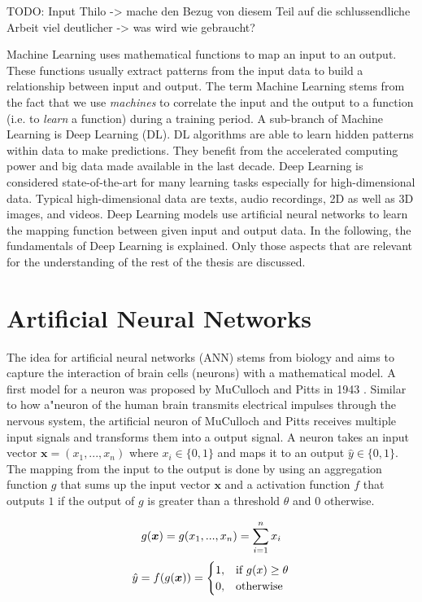 
TODO: Input Thilo -> mache den Bezug von diesem Teil auf die schlussendliche Arbeit viel deutlicher -> was wird wie gebraucht?

Machine Learning uses mathematical functions to map an input to an output.
These functions usually extract patterns from the input data to build a relationship between input and output.
The term Machine Learning stems from the fact that we use \emph{machines} to correlate the input and the output to a function (i.e. to \emph{learn} a function) during a training period.
A sub-branch of Machine Learning is Deep Learning (DL).
DL algorithms are able to learn hidden patterns within data to make predictions.
They benefit from the accelerated computing power and big data made available in the last decade.
Deep Learning is considered state-of-the-art for many learning tasks especially for high-dimensional data.
Typical high-dimensional data are texts, audio recordings, 2D as well as 3D images, and videos.
Deep Learning models use artificial neural networks to learn the mapping function between given input and output data.
In the following, the fundamentals of Deep Learning is explained.
Only those aspects that are relevant for the understanding of the rest of the thesis are discussed.

\section{Artificial Neural Networks}
The idea for artificial neural networks (ANN) stems from biology and aims to capture the interaction of brain cells (neurons) with a mathematical model.
A first model for a neuron was proposed by MuCulloch and Pitts in 1943 .
Similar to how a"neuron of the human brain transmits electrical impulses through the nervous system, the artificial neuron of MuCulloch and Pitts receives multiple input signals and transforms them into a output signal.
A neuron takes an input vector \(\boldsymbol{x} = (x_1, ..., x_n)\) where \(x_i \in \{0, 1\}\) and maps it to an output \(\hat{y} \in \{0, 1\}\).
The mapping from the input to the output is done by using an aggregation function \(g\) that sums up the input vector \(\boldsymbol{x}\) and a activation function \(f\) that outputs \(1\) if the output of \(g\) is greater than a threshold \(\theta\) and \(0\) otherwise.

\begin{equation}\eqlbl{McCulloch_Pitts_agg}
	g(\boldsymbol{x}) = g(x_1, ..., x_n) = \sum_{i=1}^{n}x_i\\
\end{equation}
\begin{equation}\eqlbl{McCulloch_Pitts_act}
		\hat{y} = f(g(\boldsymbol{x})) = \begin{cases}
      		1, & \text{if}\ g(x) \geq \theta \\
      		0, & \text{otherwise}
    	\end{cases}
\end{equation}%

